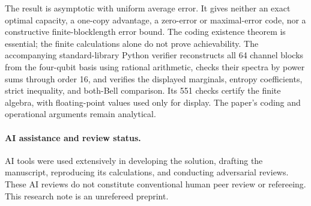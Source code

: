 \documentclass[11pt]{article}
\begin{document}
The result is asymptotic with uniform average error. It gives neither an exact
optimal capacity, a one-copy advantage, a zero-error or maximal-error code,
nor a constructive finite-blocklength error bound. The coding existence theorem
is essential; the finite calculations alone do not prove achievability.
The accompanying standard-library Python verifier reconstructs all 64 channel
blocks from the four-qubit basis using rational arithmetic, checks their
spectra by power sums through order 16, and verifies the displayed marginals,
entropy coefficients, strict inequality, and both-Bell comparison. Its 551
checks certify the finite algebra, with floating-point values used only for
display. The paper's coding and operational arguments remain analytical.

\paragraph{AI assistance and review status.}
AI tools were used extensively in developing the solution, drafting the
manuscript, reproducing its calculations, and conducting adversarial reviews.
These AI reviews do not constitute conventional human peer review or
refereeing. This research note is an unrefereed preprint.
\end{document}
